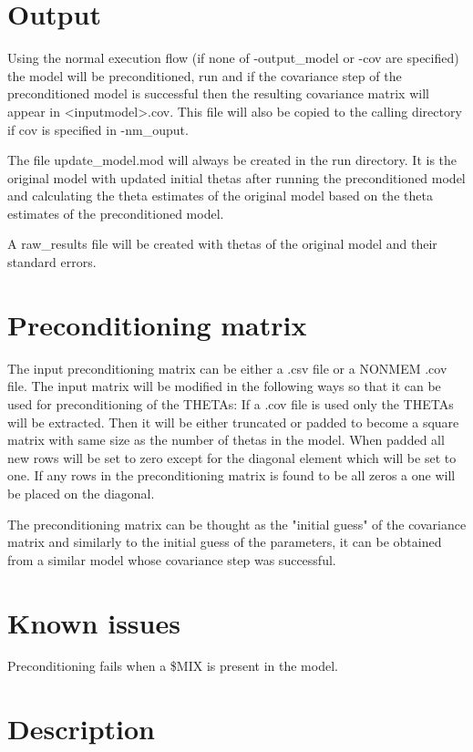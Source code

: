 \section{Output}

Using the normal execution flow (if none of -output\_model or -cov are specified) the model will be preconditioned, run and if the covariance step of the preconditioned model is successful then the resulting covariance matrix will appear in <inputmodel>.cov. This file will also be copied to the calling
directory if cov is specified in -nm\_ouput.

The file update\_model.mod will always be created in the run directory. It is the original model with updated initial thetas after
running the preconditioned model and calculating the theta estimates of the original model based on the theta estimates of the preconditioned model.

A raw\_results file will be created with thetas of the original model and their standard errors.

\section{Preconditioning matrix}

The input preconditioning matrix can be either a .csv file or a NONMEM .cov file. The input matrix will be modified in the following ways so that it can be used for preconditioning of the THETAs:
If a .cov file is used only the THETAs will be extracted.
Then it will be either truncated or padded to become a square matrix with same size as the number of thetas in the model.
When padded all new rows will be set to zero except for the diagonal element which will be set to one. If any rows in the preconditioning matrix is found
to be all zeros a one will be placed on the diagonal.

The preconditioning matrix can be thought as the "initial guess" of the covariance matrix and similarly to the initial guess of the parameters, it can be obtained from a similar model whose covariance step was successful.


\section{Known issues}
Preconditioning fails when a \$MIX is present in the model.

\section{Description}

